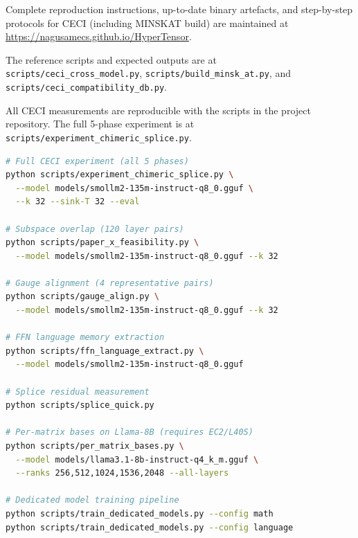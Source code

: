 \documentclass[11pt]{article}
\begin{document}
Complete reproduction instructions, up-to-date binary artefacts,
and step-by-step protocols for CECI (including MINSKAT build) are
maintained at \url{https://nagusamecs.github.io/HyperTensor}.

The reference scripts and expected outputs are at
\texttt{scripts/ceci\_cross\_model.py}, \texttt{scripts/build\_minsk\_at.py},
and \texttt{scripts/ceci\_compatibility\_db.py}.
\label{sec:repro}

All CECI measurements are reproducible with the scripts in the
project repository.  The full 5-phase experiment is at
\texttt{scripts/experiment\_chimeric\_splice.py}.

\begin{lstlisting}[language=bash]
# Full CECI experiment (all 5 phases)
python scripts/experiment_chimeric_splice.py \
  --model models/smollm2-135m-instruct-q8_0.gguf \
  --k 32 --sink-T 32 --eval

# Subspace overlap (120 layer pairs)
python scripts/paper_x_feasibility.py \
  --model models/smollm2-135m-instruct-q8_0.gguf --k 32

# Gauge alignment (4 representative pairs)
python scripts/gauge_align.py \
  --model models/smollm2-135m-instruct-q8_0.gguf --k 32

# FFN language memory extraction
python scripts/ffn_language_extract.py \
  --model models/smollm2-135m-instruct-q8_0.gguf

# Splice residual measurement
python scripts/splice_quick.py

# Per-matrix bases on Llama-8B (requires EC2/L40S)
python scripts/per_matrix_bases.py \
  --model models/llama3.1-8b-instruct-q4_k_m.gguf \
  --ranks 256,512,1024,1536,2048 --all-layers

# Dedicated model training pipeline
python scripts/train_dedicated_models.py --config math
python scripts/train_dedicated_models.py --config language
\end{lstlisting}

\printbibliography
\end{document}
